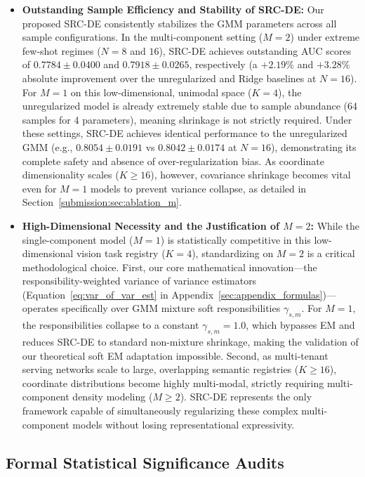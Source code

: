 \begin{itemize}
    \item {\bf Outstanding Sample Efficiency and Stability of SRC-DE:} Our proposed SRC-DE consistently stabilizes the GMM parameters across all sample configurations. In the multi-component setting ($M=2$) under extreme few-shot regimes ($N=8$ and $16$), SRC-DE achieves outstanding AUC scores of {\bf $0.7784 \pm 0.0400$} and {\bf $0.7918 \pm 0.0265$}, respectively (a $+2.19\%$ and $+3.28\%$ absolute improvement over the unregularized and Ridge baselines at $N=16$). For $M=1$ on this low-dimensional, unimodal space ($K=4$), the unregularized model is already extremely stable due to sample abundance (64 samples for 4 parameters), meaning shrinkage is not strictly required. Under these settings, SRC-DE achieves identical performance to the unregularized GMM (e.g., $0.8054 \pm 0.0191$ vs $0.8042 \pm 0.0174$ at $N=16$), demonstrating its complete safety and absence of over-regularization bias. As coordinate dimensionality scales ($K \ge 16$), however, covariance shrinkage becomes vital even for $M=1$ models to prevent variance collapse, as detailed in Section~\ref{submission:sec:ablation_m}.
    \item {\bf High-Dimensional Necessity and the Justification of $M=2$:} While the single-component model ($M=1$) is statistically competitive in this low-dimensional vision task registry ($K=4$), standardizing on $M=2$ is a critical methodological choice. First, our core mathematical innovation—the responsibility-weighted variance of variance estimators (Equation~\ref{eq:var_of_var_est} in Appendix~\ref{sec:appendix_formulas})—operates specifically over GMM mixture soft responsibilities $\gamma_{s, m}$. For $M=1$, the responsibilities collapse to a constant $\gamma_{s, m} = 1.0$, which bypasses EM and reduces SRC-DE to standard non-mixture shrinkage, making the validation of our theoretical soft EM adaptation impossible. Second, as multi-tenant serving networks scale to large, overlapping semantic registries ($K \ge 16$), coordinate distributions become highly multi-modal, strictly requiring multi-component density modeling ($M \ge 2$). SRC-DE represents the only framework capable of simultaneously regularizing these complex multi-component models without losing representational expressivity.
\end{itemize}

\subsection{Formal Statistical Significance Audits}
\label{submission:sec:significance}

